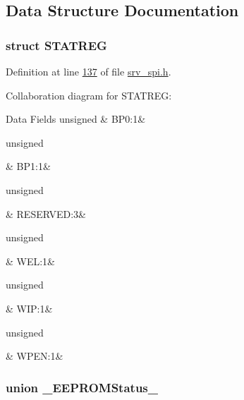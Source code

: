 \subsection{Data Structure Documentation}
\label{dc/d0c/a00783}
\hypertarget{a00007_dc/d0c/a00783}{}
\subsubsection{struct S\+T\+A\+T\+R\+E\+G}


Definition at line \hyperlink{a00007_source_l00137}{137} of file \hyperlink{a00007_source}{srv\+\_\+spi.\+h}.



Collaboration diagram for S\+T\+A\+T\+R\+E\+G\+:
\begin{DoxyFields}{Data Fields}
\hypertarget{a00007_ab3d9157e202ff59406f5ead250a755c4}{unsigned}\label{a00007_ab3d9157e202ff59406f5ead250a755c4}
&
B\+P0\+:1&
\\
\hline

\hypertarget{a00007_a15cb6e78e0c7f48b64595c2378ea646c}{unsigned}\label{a00007_a15cb6e78e0c7f48b64595c2378ea646c}
&
B\+P1\+:1&
\\
\hline

\hypertarget{a00007_a4ef10d89ed21189c926e11227bab7c3d}{unsigned}\label{a00007_a4ef10d89ed21189c926e11227bab7c3d}
&
R\+E\+S\+E\+R\+V\+E\+D\+:3&
\\
\hline

\hypertarget{a00007_a30c6e84d13356eef9e4d20600c3b5433}{unsigned}\label{a00007_a30c6e84d13356eef9e4d20600c3b5433}
&
W\+E\+L\+:1&
\\
\hline

\hypertarget{a00007_ab9c53087b26832e54862ba3c7b41a05d}{unsigned}\label{a00007_ab9c53087b26832e54862ba3c7b41a05d}
&
W\+I\+P\+:1&
\\
\hline

\hypertarget{a00007_a55afe6de18b91f01a2d525bdf47b8554}{unsigned}\label{a00007_a55afe6de18b91f01a2d525bdf47b8554}
&
W\+P\+E\+N\+:1&
\\
\hline

\end{DoxyFields}
\label{d2/db1/a00070}
\hypertarget{a00007_d2/db1/a00070}{}
\subsubsection{union \+\_\+\+E\+E\+P\+R\+O\+M\+Status\+\_\+}


